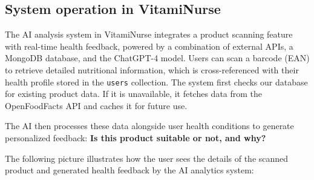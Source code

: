 \subsection{System operation in VitamiNurse}
The AI analysis system in VitamiNurse integrates a product scanning feature with real-time health feedback, powered by a combination of external APIs, a MongoDB database, and the ChatGPT-4 model. Users can scan a barcode (EAN) to retrieve detailed nutritional information, which is cross-referenced with their health profile stored in the \texttt{users} collection. The system first checks our database for existing product data. If it is unavailable, it fetches data from the OpenFoodFacts API and caches it for future use.

The AI then processes these data alongside user health conditions to generate personalized feedback: \textbf{Is this product suitable or not, and why?}

\par The following picture illustrates how the user sees the details of the scanned product and generated health feedback by the AI analytics system:

